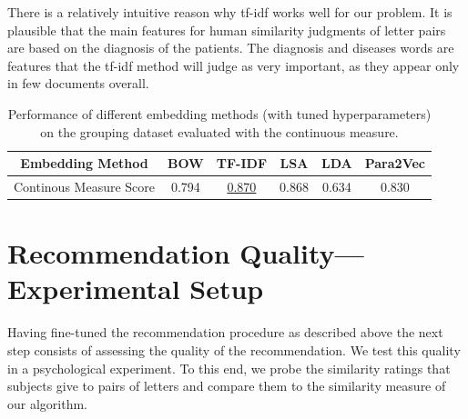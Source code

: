 There is a relatively intuitive reason why tf-idf works well for our problem. It is plausible that the main features for human similarity judgments of letter pairs are based on the diagnosis of the patients. The diagnosis and diseases words are features that the tf-idf method will judge as very important, as they appear only in few documents overall. %
\begin{table}
	\begin{tabular}{|c||c|c|c|c|c|}
		\hline 
		Embedding Method & BOW & TF-IDF & LSA & LDA  & Para2Vec\tabularnewline
		\hline 
		\hline 
		Continous Measure Score & 0.794 & \underline{0.870} & 0.868 & 0.634 & 0.830\tabularnewline
		\hline 
	\end{tabular}
	\caption{Performance of different embedding methods (with tuned hyperparameters) on the grouping dataset evaluated with the continuous measure.}
	\label{table:continuous_measure}
\end{table}



\section{Recommendation Quality---Experimental Setup}
Having fine-tuned the recommendation procedure as described above the next step consists of assessing the quality of the recommendation. We test this quality in a psychological experiment. To this end, we probe the similarity ratings that subjects give to pairs of letters and compare them to the similarity measure of our algorithm.

